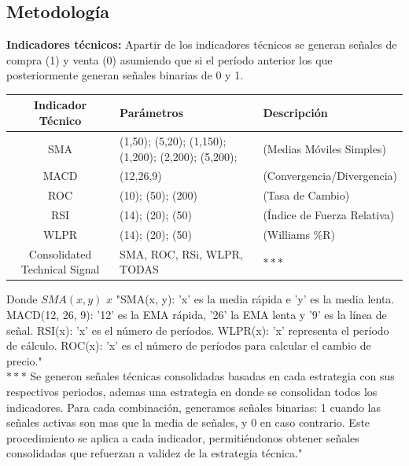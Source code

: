 \documentclass[a0,portrait]{a0poster}
\newcommand{\customsection}[1]{
    \begin{center}
        \begin{tcolorbox}[colframe=miRojo!50, colback=miRojo, width=\linewidth, boxrule=1mm, arc=3mm, auto outer arc]
            \centering
            \vspace{.5cm} %
            \color{white}
            \section*{ \textbf{\Huge #1}}  %
            \vspace{.2cm} %
        \end{tcolorbox}
    \end{center}
}
\begin{document}
\begin{multicols}{2}
\begin{minipage}{.984\linewidth}
        \end{minipage}
    \customsection{Metodología}
    \textbf{Indicadores técnicos:} Apartir de los indicadores técnicos se generan señales de compra (1) y venta (0) asumiendo que si el período anterior
     los que posteriormente generan señales binarias de 0 y 1.\\
     \begin{minipage}{.984\linewidth}
        \centering
        \vspace{1cm}
        \begin{tabular}{c p{10cm} l}
            \toprule
            \textbf{Indicador Técnico} & \textbf{Parámetros} & \textbf{Descripción}\\
            \midrule
             SMA & (1,50); (5,20); (1,150); (1,200); (2,200); (5,200);  & (Medias Móviles Simples)\\
             MACD & (12,26,9) & (Convergencia/Divergencia) \\
             ROC & (10); (50); (200) & (Tasa de Cambio) \\
             RSI & (14); (20); (50) & (Índice de Fuerza Relativa) \\
             WLPR & (14); (20); (50) &  (Williams \%R)\\
             Consolidated Technical Signal& SMA, ROC, RSi, WLPR, TODAS & \textbf{$***$} \\
            \bottomrule
        \end{tabular}
        \captionsetup{width=0.8\textwidth}  %
        \caption*{\footnotesize Donde $SMA(x,y)$ $x$ "SMA(x, y): 'x' es la media rápida e 'y' es la media lenta. MACD(12, 26, 9): '12' 
        es la EMA rápida, '26' la EMA lenta y '9' es la línea de señal. RSI(x): 'x' es el número de períodos. WLPR(x): 'x' representa el período de cálculo. 
        ROC(x): 'x' es el número de períodos para calcular el cambio de precio."\\
        \textbf{$***$} Se generon señales técnicas consolidadas basadas en cada estrategia con sus respectivos periodos, ademas una estrategia en donde se consolidan todos los indicadores. 
        Para cada combinación, generamos señales binarias: 1 cuando las señales activas son mas que la media de señales, y 0 en caso contrario. 
        Este procedimiento se aplica a cada indicador, permitiéndonos obtener señales consolidadas que refuerzan a validez de la estrategia técnica."
        }
        

\end{minipage}
\end{multicols}
\end{document}
